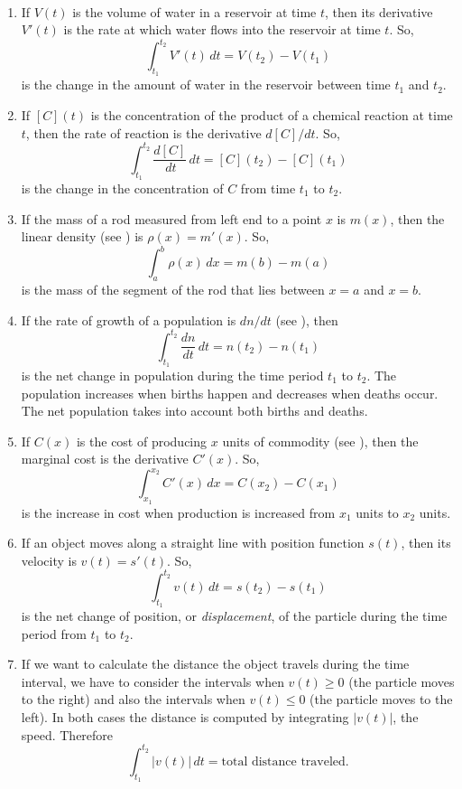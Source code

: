 \documentclass{book}
\newcommand{\dx}{\,dx}
\newcommand{\dt}{\,dt}
\begin{document}
\begin{Exam} \mbox{}\\
\begin{enumerate}
\item If $V(t)$ is the volume of water in a reservoir at time $t$, then its derivative $V'(t)$ is the rate at which water flows into the reservoir at time $t$. So, \[\int_{t_1}^{t_2} V'(t)\dt = V(t_2)-V(t_1)\] is the change in the amount of water in the reservoir between time $t_1$ and $t_2$.\\

\item If $[C](t)$ is the concentration of the product of a chemical reaction at time $t$, then the rate of reaction is the derivative $d[C]/dt$. So, \[\int_{t_1}^{t_2} \dfrac{d[C]}{\dt}\dt = [C](t_2) - [C](t_1)\] is the change in the concentration of $C$ from time $t_1$ to $t_2$.\\

\item If the mass of a rod measured from left end to a point $x$ is $m(x)$, then the linear density (see ) is $\rho(x) = m'(x)$. So, \[\int_a^b \rho(x)\dx = m(b) - m(a)\] is the mass of the segment of the rod that lies between $x=a$ and $x=b$.\\

\item If the rate of growth of a population is $dn/dt$ (see ), then \[\int_{t_1}^{t_2} \dfrac{dn}{dt}\dt = n(t_2)-n(t_1)\] is the net change in population during the time period $t_1$ to $t_2$. The population increases when births happen and decreases when deaths occur. The net population takes into account both births and deaths.\\

\item If $C(x)$ is the cost of producing $x$ units of commodity (see ), then the marginal cost is the derivative $C'(x)$. So, \[\int_{x_1}^{x_2} C'(x)\dx = C(x_2)-C(x_1)\] is the increase in cost when production is increased from $x_1$ units to $x_2$ units.\\

\item If an object moves along a straight line with position function $s(t)$, then its velocity is $v(t)=s'(t)$. So, \[\int_{t_1}^{t_2} v(t)\dt = s(t_2) - s(t_1)\] is the net change of position, or \emph{displacement}, of the particle during the time period from $t_1$ to $t_2$. \\

\item If we want to calculate the distance the object travels during the time interval, we have to consider the intervals when $v(t)\ge 0$ (the particle moves to the right) and also the intervals when $v(t) \le 0$ (the particle moves to the left). In both cases the distance is computed by integrating $|v(t)|$, the speed. Therefore \[\int_{t_1}^{t_2} |v(t)|\dt = \mbox{total distance traveled}. \]
\end{enumerate}
\end{Exam}\vs
\end{document}
